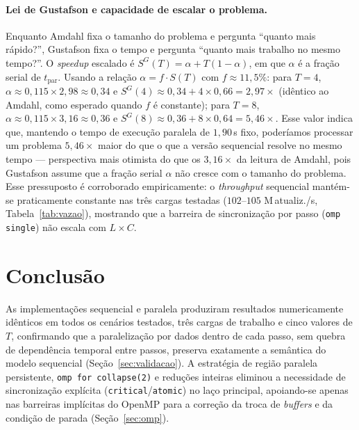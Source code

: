 \documentclass[11pt,a4paper]{article}
\begin{document}
\paragraph{Lei de Gustafson e capacidade de escalar o problema.}
Enquanto Amdahl fixa o tamanho do problema e pergunta ``quanto mais rápido?'', Gustafson fixa o tempo e pergunta ``quanto mais trabalho no mesmo tempo?''. O \emph{speedup} escalado é $S^G(T) = \alpha + T(1-\alpha)$, em que $\alpha$ é a fração serial de $t_\text{par}$. Usando a relação $\alpha = f \cdot S(T)$ com $f \approx 11{,}5\%$: para $T = 4$, $\alpha \approx 0{,}115 \times 2{,}98 \approx 0{,}34$ e $S^G(4) \approx 0{,}34 + 4 \times 0{,}66 = 2{,}97\times$ (idêntico ao Amdahl, como esperado quando $f$ é constante); para $T = 8$, $\alpha \approx 0{,}115 \times 3{,}16 \approx 0{,}36$ e $S^G(8) \approx 0{,}36 + 8 \times 0{,}64 = 5{,}46\times$. Esse valor indica que, mantendo o tempo de execução paralela de $1{,}90$\,s fixo, poderíamos processar um problema $5{,}46\times$ maior do que o que a versão sequencial resolve no mesmo tempo --- perspectiva mais otimista do que os $3{,}16\times$ da leitura de Amdahl, pois Gustafson assume que a fração serial $\alpha$ não cresce com o tamanho do problema. Esse pressuposto é corroborado empiricamente: o \emph{throughput} sequencial mantém-se praticamente constante nas três cargas testadas ($102$--$105$ M\,atualiz./s, Tabela~\ref{tab:vazao}), mostrando que a barreira de sincronização por passo (\texttt{omp single}) não escala com $L \times C$.

\section{Conclusão}
\label{sec:conclusao}

As implementações sequencial e paralela produziram resultados numericamente idênticos em todos os cenários testados, três cargas de trabalho e cinco valores de $T$, confirmando que a paralelização por dados dentro de cada passo, sem quebra de dependência temporal entre passos, preserva exatamente a semântica do modelo sequencial (Seção~\ref{sec:validacao}). A estratégia de região paralela persistente, \texttt{omp for collapse(2)} e reduções inteiras eliminou a necessidade de sincronização explícita (\texttt{critical}/\texttt{atomic}) no laço principal, apoiando-se apenas nas barreiras implícitas do OpenMP para a correção da troca de \emph{buffers} e da condição de parada (Seção~\ref{sec:omp}).
\end{document}
